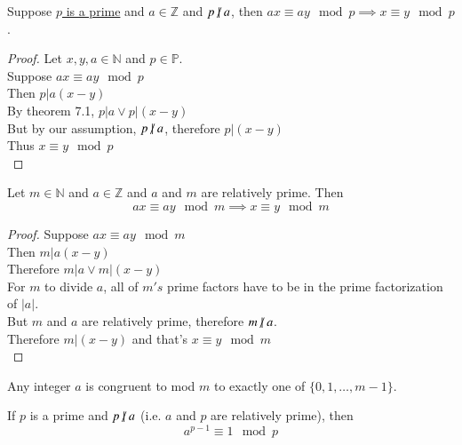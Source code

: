 \documentclass[10pt]{article}
\begin{document}
	\begin{theorem}
		Suppose \ul{$p$ is a prime} and $a \in \mathbb{Z}$ and $p \centernot | a$, then $ax \equiv ay \mod p \implies x \equiv y \mod p$.
	\end{theorem}
	
	\begin{proof}
		Let $x,y,a \in \mathbb{N}$ and $p \in \mathbb{P}$. \\
		Suppose $ax \equiv ay \mod p$ \\
		Then $p | a(x-y)$ \\
		By theorem 7.1, $p | a \lor p | (x-y)$\\
		But by our assumption, $p \centernot | a$, therefore $p | (x-y)$ \\
		Thus $x \equiv y \mod p$ \\
	\end{proof}
	
	\begin{theorem}
		Let $m \in \mathbb{N}$ and $a \in \mathbb{Z}$ and $a$ and $m$ are relatively prime. Then 
		\[
			ax \equiv ay \mod m \implies x \equiv y \mod m
		\]
	\end{theorem}
	
	\begin{proof}
		Suppose $ax \equiv ay \mod m$ \\
		Then $m | a(x-y)$ \\
		Therefore $m | a \lor m | (x - y)$ \\
		For $m$ to divide $a$, all of $m's$ prime factors have to be in the prime factorization of $|a|$. \\
		But $m$ and $a$ are relatively prime, therefore $m \centernot | a$. \\
		Therefore $m | (x-y)$ and that's $x \equiv y \mod m$\\
	\end{proof}
	
	\begin{theorem}
		Any integer $a$ is congruent to mod $m$ to exactly one of $\{0, 1, \dots, m-1\}$.
	\end{theorem}
	
	\begin{theorem}
		If $p$ is a prime and $p \centernot | a$ (i.e. $a$ and $p$ are relatively prime), then
		\[
			a^{p-1} \equiv 1 \mod p
		\]
	\end{theorem}
	
\end{document}
